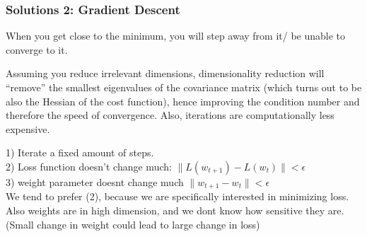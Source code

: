 \documentclass{beamer}
\renewenvironment{enumerate}%
{\begin{list}{\arabic{enumi}.}%
      {\setlength{\leftmargin}{2.5em}%
       \setlength{\itemsep}{-\parsep}%
       \setlength{\topsep}{-\parskip}%
       \usecounter{enumi}}%
 }{\end{list}}
\begin{document}
\begin{frame}
\frametitle{Solutions 2: Gradient Descent}
\begin{solution}
\begin{enumerate}
\item[4.] 
When you get close to the minimum, you will step away from it/ be unable to converge to it.
\item[5.]
Assuming you reduce irrelevant dimensions, dimensionality reduction will “remove” the smallest eigenvalues of the covariance matrix (which turns out to be also the Hessian of the cost function), hence improving the condition number and therefore the speed of convergence.
Also, iterations are computationally less expensive.
\item[6.] 
1) Iterate a fixed amount of steps. \\
2) Loss function doesn't change much: $\|L(w_{t+1})-L(w_t)\| < \epsilon$ \\
3) weight parameter doesnt change much $\|w_{t+1} - w_t\| < \epsilon$ \\
We tend to prefer (2), because we are specifically interested in minimizing loss. Also weights are in high dimension, and we dont know how sensitive they are. (Small change in weight could lead to large change in loss)
\end{enumerate}
\end{solution}
\end{frame}
\end{document}
